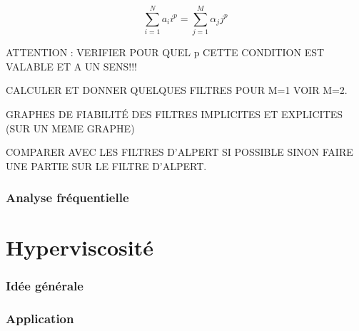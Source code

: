 \documentclass[10pt,a4paper]{amsart}
\begin{document}
\begin{equation}
  \label{eq:implicite:cond2b}
  \sum_{i=1}^N a_i i^p = \sum_{j=1}^M \alpha_j j^p
\end{equation}

ATTENTION : VERIFIER POUR QUEL p CETTE CONDITION EST VALABLE ET A UN SENS!!!

CALCULER ET DONNER QUELQUES FILTRES POUR M=1 VOIR M=2.

GRAPHES DE FIABILIT\'E DES FILTRES IMPLICITES ET EXPLICITES (SUR UN MEME GRAPHE)

COMPARER AVEC LES FILTRES D'ALPERT SI POSSIBLE SINON FAIRE UNE PARTIE SUR LE FILTRE D'ALPERT.

    


\section{Analyse fréquentielle}



%
%

\part{Hyperviscosité}

\section{Idée générale}

\section{Application}








\newpage
\end{document}

